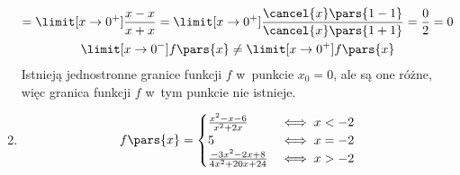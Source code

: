 \begin{enumerate}[label={\alph*)}]
\begin{gather*}
                = \limit[x \to 0^+] \frac{x - x}{x + x}
                = \limit[x \to 0^+] \frac{\cancel{x}\pars{1 - 1}}{\cancel{x}\pars{1 + 1}}
                = \frac{0}{2}
                = 0\\
            \limit[x \to 0^-] f\pars{x} \neq \limit[x \to 0^+] f\pars{x}
        \end{gather*}
        Istnieją jednostronne granice funkcji \(f\) w~punkcie \(x_0 = 0\), ale są one różne, więc granica funkcji \(f\) w~tym punkcie nie istnieje.
    \item
        \begin{gather*}
            f\pars{x} = \begin{cases}
                \frac{x^2 - x - 6}{x^2 + 2x} & \iff x < -2\\
                5 & \iff x = -2\\
                \frac{-3x^2 - 2x + 8}{4x^2 + 20x + 24} & \iff x > -2
            \end{cases}
        \end{gather*}
\end{enumerate}
